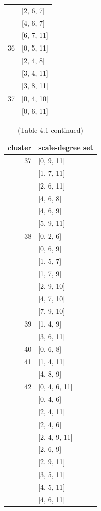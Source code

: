 \begin{table}
\begin{multicols}{3}
{\begin{tabular}[t]{r |l }
	&	[2, 6, 7]	\\
	&	[4, 6, 7]	\\
	&	[6, 7, 11]	\\
36	&	[0, 5, 11]	\\
	&	[2, 4, 8]	\\
	&	[3, 4, 11]	\\
	&	[3, 8, 11]	\\
37	&	[0, 4, 10]	\\
	&	[0, 6, 11]	\\
\end{tabular}
}
\vfill
\end{multicols}
\end{table}

\begin{table}
\caption*{(Table 4.1 continued)}
\begin{multicols}{3}
{\small
\begin{tabular}[t]{r|l}
\hline\hline
cluster & scale-degree set\\ [0.5ex]
\hline
37	&	[0, 9, 11]	\\
	&	[1, 7, 11]	\\
	&	[2, 6, 11]	\\
	&	[4, 6, 8]	\\
	&	[4, 6, 9]	\\
	&	[5, 9, 11]	\\
38	&	[0, 2, 6]	\\
	&	[0, 6, 9]	\\
	&	[1, 5, 7]	\\
	&	[1, 7, 9]	\\
	&	[2, 9, 10]	\\
	&	[4, 7, 10]	\\
	&	[7, 9, 10]	\\
39	&	[1, 4, 9]	\\
	&	[3, 6, 11]	\\
40	&	[0, 6, 8]	\\
41	&	[1, 4, 11]	\\
	&	[4, 8, 9]	\\
42	&	[0, 4, 6, 11]	\\
	&	[0, 4, 6]	\\
	&	[2, 4, 11]	\\
	&	[2, 4, 6]	\\
	&	[2, 4, 9, 11]	\\
	&	[2, 6, 9]	\\
	&	[2, 9, 11]	\\
	&	[3, 5, 11]	\\
	&	[4, 5, 11]	\\
	&	[4, 6, 11]	\\

\end{tabular}}
\end{multicols}
\end{table}
